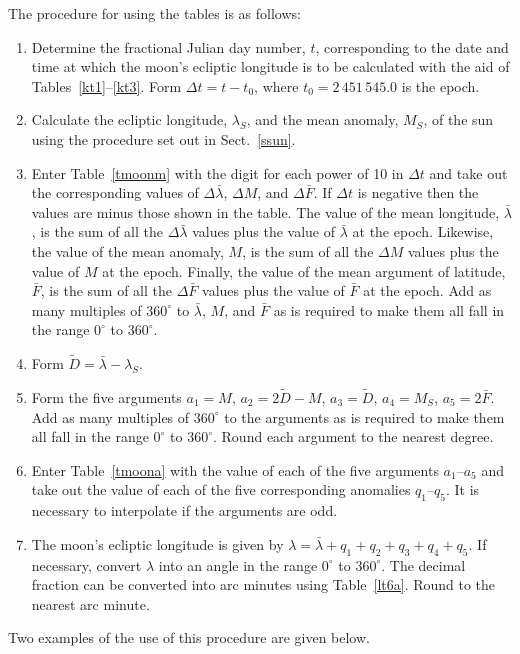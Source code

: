 The procedure for using the tables is as follows:
\begin{enumerate}
 \item Determine the fractional Julian day number, $t$, corresponding to the date and time
at which the moon's ecliptic longitude is to be calculated with the aid of Tables~\ref{kt1}--\ref{kt3}. Form $\Delta t = t-t_0$, where $t_0=2\,451\,545.0$ is the epoch. 
\item Calculate the ecliptic longitude, $\lambda_S$, and the mean anomaly, $M_S$, of the
sun using the procedure set out in Sect.~\ref{ssun}.
\item Enter Table~\ref{tmoonm} with the digit for each power of 10
in ${\Delta} t$ and take out the corresponding values of $\Delta\bar{\lambda}$, $\Delta M$,
and $\Delta\bar{F}$. If $\Delta t$ is negative then the 
values are minus those shown in the table.
The value of the mean longitude, $\bar{\lambda}$, is the
sum of all the $\Delta\bar{\lambda}$ values plus the value of $\bar{\lambda}$ at the epoch. Likewise, the value of the mean anomaly, $M$, is
the sum of all the $\Delta M$ values plus the value of $M$ at the epoch. Finally, the value of the mean argument of latitude, $\bar{F}$, is the
sum of all the $\Delta\bar{F}$ values plus the value of $\bar{F}$ at the epoch. 
Add as many multiples of $360^\circ$ to $\bar{\lambda}$, $M$, and $\bar{F}$
as is required to make them all fall in the range $0^\circ$ to $360^\circ$. 
\item Form $\tilde{D}=\bar{\lambda}-\lambda_S$. 
\item Form the five arguments $a_1=M$, $a_2=2\tilde{D} - M$, $a_3=\tilde{D}$, $a_4 = M_S$, $a_5=2\bar{F}$. Add as
many multiples of $360^\circ$ to the arguments as is required to make them all fall in the range
$0^\circ$ to $360^\circ$. Round each argument to the nearest degree.
\item Enter Table~\ref{tmoona} with the value of each of the five arguments $a_1$--$a_5$ and take out the
value of each of the five corresponding  anomalies $q_1$--$q_5$. It is necessary to interpolate if the arguments are odd.
\item The moon's ecliptic longitude is given by $\lambda=\bar{\lambda} + q_1+q_2+q_3+q_4+q_5$.
If necessary, convert $\lambda$ into an angle in the range $0^\circ$ to $360^\circ$. 
The decimal fraction can be converted into arc minutes
using Table~\ref{lt6a}. Round to the nearest arc minute. 
\end{enumerate}
Two examples of the use of this procedure are given below.

